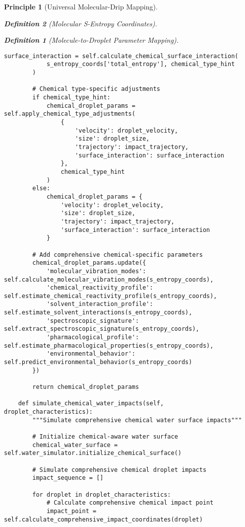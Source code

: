 \documentclass[12pt,a4paper]{article}
\newtheorem{definition}{Definition}
\newtheorem{principle}{Principle}
\begin{document}
\begin{principle}[Universal Molecular-Drip Mapping]
\begin{definition}[Molecular S-Entropy Coordinates]
\begin{definition}[Molecule-to-Droplet Parameter Mapping]
\begin{algorithm}
\begin{algorithmic}[1]
\begin{lstlisting}[style=pythonstyle, caption=Core Molecule-to-Drip Implementation for Comprehensive Chemical Analysis]
        surface_interaction = self.calculate_chemical_surface_interaction(
            s_entropy_coords['total_entropy'], chemical_type_hint
        )
        
        # Chemical type-specific adjustments
        if chemical_type_hint:
            chemical_droplet_params = self.apply_chemical_type_adjustments(
                {
                    'velocity': droplet_velocity,
                    'size': droplet_size,
                    'trajectory': impact_trajectory,
                    'surface_interaction': surface_interaction
                },
                chemical_type_hint
            )
        else:
            chemical_droplet_params = {
                'velocity': droplet_velocity,
                'size': droplet_size,
                'trajectory': impact_trajectory,
                'surface_interaction': surface_interaction
            }
        
        # Add comprehensive chemical-specific parameters
        chemical_droplet_params.update({
            'molecular_vibration_modes': self.calculate_molecular_vibration_modes(s_entropy_coords),
            'chemical_reactivity_profile': self.estimate_chemical_reactivity_profile(s_entropy_coords),
            'solvent_interaction_profile': self.estimate_solvent_interactions(s_entropy_coords),
            'spectroscopic_signature': self.extract_spectroscopic_signature(s_entropy_coords),
            'pharmacological_profile': self.estimate_pharmacological_properties(s_entropy_coords),
            'environmental_behavior': self.predict_environmental_behavior(s_entropy_coords)
        })
        
        return chemical_droplet_params
    
    def simulate_chemical_water_impacts(self, droplet_characteristics):
        """Simulate comprehensive chemical water surface impacts"""
        
        # Initialize chemical-aware water surface
        chemical_water_surface = self.water_simulator.initialize_chemical_surface()
        
        # Simulate comprehensive chemical droplet impacts
        impact_sequence = []
        
        for droplet in droplet_characteristics:
            # Calculate comprehensive chemical impact point
            impact_point = self.calculate_comprehensive_impact_coordinates(droplet)
            

\end{lstlisting}
\end{algorithmic}
\end{algorithm}
\end{definition}
\end{definition}
\end{principle}
\end{document}
